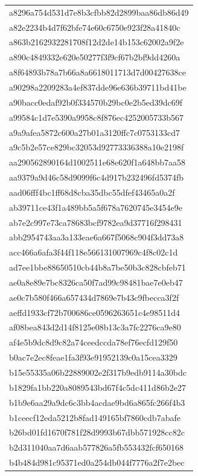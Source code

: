 \begin{tabular}{l}
a8296a754d531d7e8b3cfbb82d2899baa86db86d49 \\
a82e2234b4d7f62bfe74e60c6750e923f28a41840c \\
a863b2162932281708f12d2de14b153c62002a9f2e \\
a890c4849332e620e50277f3f9cf67b2bf9dd4260a \\
a8f64893b78a7b66a8a6618011713d7d00427638ce \\
a90298a2209283a4ef837dde96e636b39711bd41be \\
a90bacc0edaf92b0f334570b29bc0e2b5ed39dc69f \\
a99584c1d7e5390a9958c8f876ec4252005733b567 \\
a9a9afea5872c600a27b01a3120ffc7c0753133cd7 \\
a9c5b2e57ce829bc32053d92773336388a10e2198f \\
aa290562890164d1002511e68e620f1a648bb7aa58 \\
aa9379a9d46c58d9099f6c4d917b232496fd5374fb \\
aad06fff4bc1ff68d8cba35dbc55dfef43465a0a2f \\
ab39711ce43f1a489bb5a5f678a7620745e3454e9e \\
ab7e2c997e73ca78683bcf9782ea9d37716f298431 \\
abb2954743aa3a133eae6a667f5068c904f3dd73a8 \\
acc466a6afa3f44f118e566131007969c4f8c02c1d \\
ad7ee1bbe88650510cb44b8a7be50b3c828cbfeb71 \\
ae0a8e89e7bc8326ca50f7ad99c98481bae7e0eb47 \\
ae0c7b580f466a657434d7869e7b43c9fbecca3f2f \\
aeffd1933cf72b700686ce0596263651c4e98511d4 \\
af08bea843d2d14f8125e08b13c3a7fc2276ca9e80 \\
af4e5b9dc8d9c82a74ceedccda78ef76ecfd129f50 \\
b0ac7e2ec8feae1fa3f93e91952139c0a15cea3329 \\
b15e55335a06b22889002e2f317b9edb9114a30bdc \\
b1829fa1bb220a8089543bd67f4c5dc411d86b2e27 \\
b1b9e6aa29a9dc6c3bb4acdae9bd6a865fc266f4b3 \\
b1ceecf12eda5212b8fad149165bf7860cdb7abafe \\
b26bd01fd1670f781f28d9993b67dbb571928cc82c \\
b2d311040aa7d6aab577826a5fb553432fcf650168 \\
b4b484d981c95371ed0a254db044f7776a2f7e2bec \\

\end{tabular}
